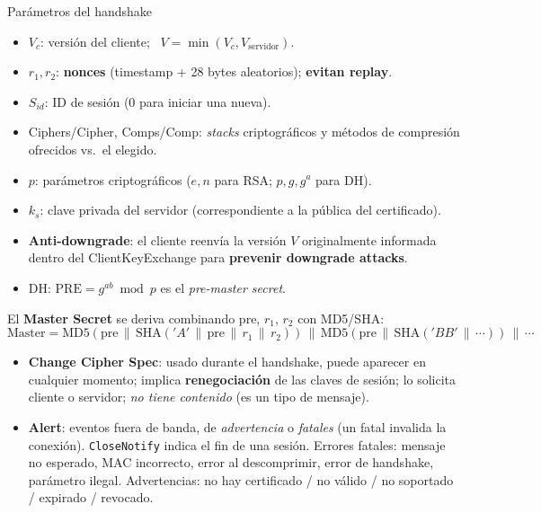 \documentclass[11pt,a4paper]{article}
\newcommand{\concat}{\,\|\,}
\begin{document}
\begin{defbox}{Parámetros del handshake}
\begin{itemize}[leftmargin=1.4em,itemsep=1pt]
  \item $V_c$: versión del cliente; \ $V = \min(V_c, V_{\text{servidor}})$.
  \item $r_1, r_2$: \textbf{nonces} (timestamp + 28 bytes aleatorios); \textbf{evitan replay}.
  \item $S_{id}$: ID de sesión ($0$ para iniciar una nueva).
  \item Ciphers/Cipher, Comps/Comp: \emph{stacks} criptográficos y métodos de compresión
        ofrecidos vs.\ el elegido.
  \item $p$: parámetros criptográficos ($e,n$ para RSA; $p,g,g^a$ para DH).
  \item $k_s$: clave privada del servidor (correspondiente a la pública del certificado).
  \item \textbf{Anti-downgrade}: el cliente reenvía la versión $V$ originalmente informada
        dentro del ClientKeyExchange para \textbf{prevenir downgrade attacks}.
  \item DH: $\mathrm{PRE} = g^{ab} \bmod p$ es el \emph{pre-master secret}.
\end{itemize}
El \textbf{Master Secret} se deriva combinando $\mathrm{pre}$, $r_1$, $r_2$ con MD5/SHA:
\[
  \text{Master} = \mathrm{MD5}(\mathrm{pre}\concat \mathrm{SHA}('A'\concat \mathrm{pre}\concat r_1\concat r_2))
  \concat \mathrm{MD5}(\mathrm{pre}\concat \mathrm{SHA}('BB'\concat \cdots)) \concat \cdots
\]
\end{defbox}

\begin{itemize}[leftmargin=1.4em,itemsep=2pt]
  \item \textbf{Change Cipher Spec}: usado durante el handshake, puede aparecer en cualquier
        momento; implica \textbf{renegociación} de las claves de sesión; lo solicita cliente o
        servidor; \emph{no tiene contenido} (es un tipo de mensaje).
  \item \textbf{Alert}: eventos fuera de banda, de \emph{advertencia} o \emph{fatales} (un
        fatal invalida la conexión). \texttt{CloseNotify} indica el fin de una sesión. Errores
        fatales: mensaje no esperado, MAC incorrecto, error al descomprimir, error de
        handshake, parámetro ilegal. Advertencias: no hay certificado / no válido / no
        soportado / expirado / revocado.
\end{itemize}
\end{document}
